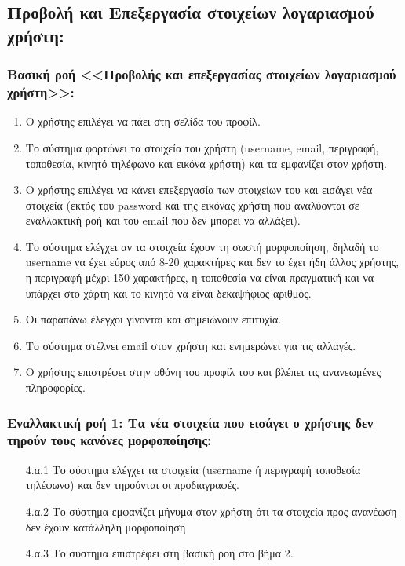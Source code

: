 \documentclass[12pt,a4paper]{article}
\begin{document}
\subsection{Προβολή και Επεξεργασία στοιχείων λογαριασμού χρήστη:}

\subsubsection*{Βασική ροή <<Προβολής και επεξεργασίας στοιχείων λογαριασμού \\χρήστη>>:}
\begin{enumerate}
    \item Ο χρήστης επιλέγει να πάει στη σελίδα του προφίλ. 
    \item Το σύστημα φορτώνει τα στοιχεία του χρήστη (username, email, περιγραφή, τοποθεσία, κινητό τηλέφωνο και εικόνα χρήστη) και τα εμφανίζει στον χρήστη.
    \item Ο χρήστης επιλέγει να κάνει επεξεργασία των στοιχείων του και εισάγει νέα στοιχεία (εκτός του password και της εικόνας χρήστη που αναλύονται σε εναλλακτική ροή και του email που δεν μπορεί να αλλάξει). 
    \item Το σύστημα ελέγχει αν τα στοιχεία έχουν τη σωστή μορφοποίηση, δηλαδή το username να έχει εύρος από 8-20 χαρακτήρες και δεν το έχει ήδη άλλος χρήστης, η περιγραφή μέχρι 150 χαρακτήρες, η τοποθεσία να είναι πραγματική και να υπάρχει στο χάρτη και το κινητό να είναι δεκαψήφιος αριθμός.
    \item Οι παραπάνω έλεγχοι γίνονται και σημειώνουν επιτυχία.
    \item Το σύστημα στέλνει email στον χρήστη και ενημερώνει για τις αλλαγές.
    \item Ο χρήστης επιστρέφει στην οθόνη του προφίλ του και βλέπει τις ανανεωμένες πληροφορίες.
\end{enumerate}

\subsubsection*{Εναλλακτική ροή 1: Τα νέα στοιχεία που εισάγει ο χρήστης δεν τηρούν τους κανόνες μορφοποίησης:}
\begin{enumerate}
    \item [4.α.1] Το σύστημα ελέγχει τα στοιχεία (username ή περιγραφή τοποθεσία τηλέφωνο) και δεν τηρούνται οι προδιαγραφές.
    \item [4.α.2] Το σύστημα εμφανίζει μήνυμα στον χρήστη ότι τα στοιχεία προς ανανέωση δεν έχουν κατάλληλη μορφοποίηση
    \item [4.α.3] Το σύστημα επιστρέφει στη βασική ροή στο βήμα 2.  
\end{enumerate}
\end{document}
